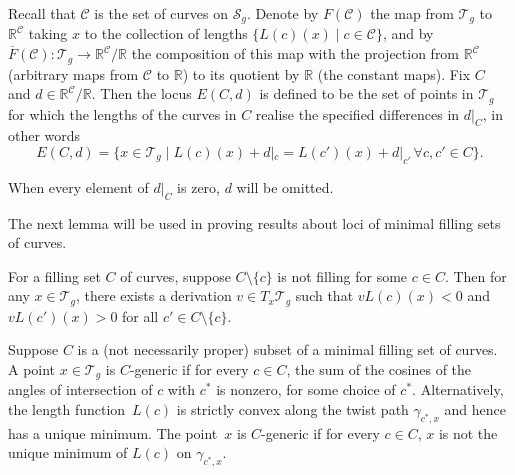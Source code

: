 Recall that $\mathcal{C}$ is the set of curves on $\mathcal{S}_{g}$. Denote by $F(\mathcal{C})$ the map from $\mathcal{T}_{g}$ to $\mathbb{R}^{\mathcal{C}}$ taking $x$ to the collection of lengths $\{L(c)(x) \mid c\in \mathcal{C}\}$, and by $\overline{F}(\mathcal{C})\colon\mathcal{T}_{g}\rightarrow \mathbb{R}^{\mathcal{C}}/\mathbb{R}$ the composition of this map with the projection from $\mathbb{R}^{\mathcal{C}}$ (arbitrary maps from $\mathcal{C}$ to $\mathbb{R}$) to its quotient by $\mathbb{R}$ (the constant maps). Fix $C$ and $d\in \mathbb{R}^{\mathcal{C}}/\mathbb{R}$. Then the locus $E(C,d)$ is defined to be the set of points in $\mathcal{T}_{g}$ for which the lengths of the curves in $C$ realise the specified differences in $d|_{C}$, in other words
\begin{equation}
\label{withd}
E(C,d)=\{x\in \mathcal{T}_{g} \mid L(c)(x)+d|_{c}=L(c')(x)+d|_{c'} \, \forall c,c'\in C\}.
\end{equation}

When every element of $d|_{C}$ is zero, $d$ will be omitted.

The next lemma will be used in proving results about loci of minimal filling sets of curves.

\begin{Lemma}\label{LipschitzMap}
For a filling set $C$ of curves, suppose $C\setminus \{c\}$ is not filling for some $c\in C$. Then for any $x\in \mathcal{T}_{g}$, there exists a derivation $v\in T_{x}\mathcal{T}_{g}$ such that $vL(c)(x)<0$ and $vL(c')(x)>0$ for all $c'\in C\setminus \{c\}$.
\end{Lemma}

\begin{Definition}[$C$-generic]
Suppose $C$ is a (not necessarily proper) subset of a minimal filling set of curves. A point $x\in \mathcal{T}_{g}$ is $C$-generic if for every $c\in C$, the sum of the cosines of the angles of intersection of $c$ with $c^{*}$ is nonzero, for some choice of $c^{*}$. Alternatively, the length function~$L(c)$ is strictly convex along the twist path $\gamma_{c^{*},x}$ and hence has a unique minimum. The point~$x$ is $C$-generic if for every $c\in C$, $x$ is not the unique minimum of $L(c)$ on $\gamma_{c^{*},x}$.
\end{Definition}

